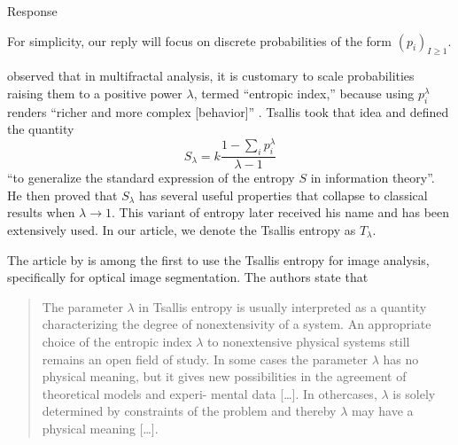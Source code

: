 \documentclass[11pt]{report}
\begin{document}
\begin{responsebox}{Response}

For simplicity, our reply will focus on discrete probabilities of the form $(p_i)_{I\geq 1}$.

\citet{Tsallis1988} observed that in multifractal analysis, it is customary to scale probabilities raising them to a positive power $\lambda$, termed ``entropic index,'' because using $p_i^\lambda$ renders ``richer and more complex [behavior]'' \citep{FractalMeasuresandTheirSingularitiestheCharacterizationofStrangeSets}.
Tsallis took that idea and defined the quantity 
$$
S_\lambda = k \frac{1-\sum_{i} p_i^\lambda}{\lambda-1}
$$
``to generalize the standard expression of the entropy $S$ in information theory''.
He then proved that $S_\lambda$ has several useful properties that collapse to classical results when $\lambda\to1$.
This variant of entropy later received his name and has been extensively used.
In our article, we denote the Tsallis entropy as $T_\lambda$.

The article by \citet{ImageThresholdingUsingTsallisEntropy} is among the first to use the Tsallis entropy for image analysis, specifically for optical image segmentation.
The authors state that
\begin{quote}
The parameter $\lambda$ in Tsallis entropy is usually
interpreted as a quantity characterizing the degree
of nonextensivity of a system. An appropriate
choice of the entropic index $\lambda$ to nonextensive
physical systems still remains an open field of
study. In some cases the parameter $\lambda$ has no
physical meaning, but it gives new possibilities in
the agreement of theoretical models and experi-
mental data [\dots]. In
othercases, $\lambda$ is solely determined by constraints of
the problem and thereby $\lambda$ may have a physical
meaning [\dots].
\end{quote}
\end{responsebox}
\end{document}
